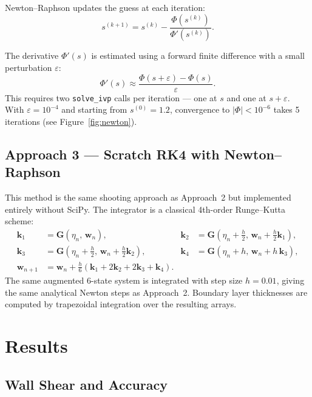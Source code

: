 \documentclass[12pt,a4paper]{article}
\begin{document}
Newton--Raphson updates the guess at each iteration:
\begin{equation}
    s^{(k+1)} = s^{(k)} - \frac{\Phi(s^{(k)})}{\Phi'(s^{(k)})}.
\end{equation}

The derivative $\Phi'(s)$ is estimated using a forward finite difference with a small perturbation $\varepsilon$:
\begin{equation}
    \Phi'(s) \approx \frac{\Phi(s + \varepsilon) - \Phi(s)}{\varepsilon}.
\end{equation}
This requires two \texttt{solve\_ivp} calls per iteration --- one at $s$ and one at $s + \varepsilon$. With $\varepsilon = 10^{-4}$ and starting from $s^{(0)} = 1.2$, convergence to $|\Phi| < 10^{-6}$ takes 5 iterations (see Figure~\ref{fig:newton}).

\subsection{Approach 3 --- Scratch RK4 with Newton--Raphson}

This method is the same shooting approach as Approach~2 but implemented entirely without SciPy. The integrator is a classical 4th-order Runge--Kutta scheme:
\begin{align}
    \mathbf{k}_1 &= \mathbf{G}(\eta_n,\, \mathbf{w}_n), &
    \mathbf{k}_2 &= \mathbf{G}\!\left(\eta_n + \tfrac{h}{2},\, \mathbf{w}_n + \tfrac{h}{2}\mathbf{k}_1\right), \\
    \mathbf{k}_3 &= \mathbf{G}\!\left(\eta_n + \tfrac{h}{2},\, \mathbf{w}_n + \tfrac{h}{2}\mathbf{k}_2\right), &
    \mathbf{k}_4 &= \mathbf{G}(\eta_n + h,\, \mathbf{w}_n + h\,\mathbf{k}_3), \\
    \mathbf{w}_{n+1} &= \mathbf{w}_n + \tfrac{h}{6}(\mathbf{k}_1 + 2\mathbf{k}_2 + 2\mathbf{k}_3 + \mathbf{k}_4). & &
\end{align}
The same augmented 6-state system is integrated with step size $h = 0.01$, giving the same analytical Newton steps as Approach~2. Boundary layer thicknesses are computed by trapezoidal integration over the resulting arrays.

\section{Results}

\subsection{Wall Shear and Accuracy}
\end{document}
